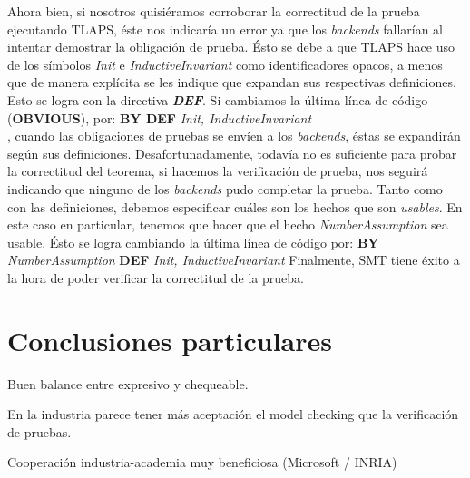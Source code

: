 \documentclass[spanish]{llncs}
\begin{document}
Ahora bien, si nosotros quisiéramos corroborar la correctitud de la prueba ejecutando TLAPS, éste nos indicaría un error ya que los \textit{backends} fallarían al intentar demostrar la obligación de prueba. Ésto se debe a que TLAPS
hace uso de los símbolos \textit{Init} e \textit{InductiveInvariant} como identificadores opacos, a menos que de manera explícita se les indique que expandan sus respectivas definiciones. Esto se logra con la directiva \textbf{\textit{DEF}}. 
Si cambiamos la última línea de código (\textbf{OBVIOUS}), por:
\subitem \textbf{BY DEF} \textit{Init, InductiveInvariant}\\
, cuando las obligaciones de pruebas se envíen a los \textit{backends}, éstas se expandirán según sus definiciones. Desafortunadamente, todavía no es suficiente para probar la correctitud del teorema, si hacemos la verificación de prueba, nos seguirá indicando que ninguno de los \textit{backends} pudo completar la prueba.
Tanto como con las definiciones, debemos especificar cuáles son los hechos que son \textit{usables}. En este caso en particular, tenemos que hacer que el hecho \textit{NumberAssumption} sea usable. Ésto se logra cambiando la última línea de código por:
\subitem \textbf{BY} \textit{NumberAssumption} \textbf{DEF} \textit{Init, InductiveInvariant}
Finalmente, SMT tiene éxito a la hora de poder verificar la correctitud de la prueba.
\section{Conclusiones particulares}

Buen balance entre expresivo y chequeable.

En la industria parece tener más aceptación el model checking que la verificación de pruebas.

Cooperación industria-academia muy beneficiosa (Microsoft / INRIA)
\end{document}
